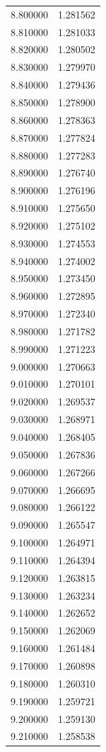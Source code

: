 \begin{tabular}{rr}
8.800000 & 1.281562 \\
8.810000 & 1.281033 \\
8.820000 & 1.280502 \\
8.830000 & 1.279970 \\
8.840000 & 1.279436 \\
8.850000 & 1.278900 \\
8.860000 & 1.278363 \\
8.870000 & 1.277824 \\
8.880000 & 1.277283 \\
8.890000 & 1.276740 \\
8.900000 & 1.276196 \\
8.910000 & 1.275650 \\
8.920000 & 1.275102 \\
8.930000 & 1.274553 \\
8.940000 & 1.274002 \\
8.950000 & 1.273450 \\
8.960000 & 1.272895 \\
8.970000 & 1.272340 \\
8.980000 & 1.271782 \\
8.990000 & 1.271223 \\
9.000000 & 1.270663 \\
9.010000 & 1.270101 \\
9.020000 & 1.269537 \\
9.030000 & 1.268971 \\
9.040000 & 1.268405 \\
9.050000 & 1.267836 \\
9.060000 & 1.267266 \\
9.070000 & 1.266695 \\
9.080000 & 1.266122 \\
9.090000 & 1.265547 \\
9.100000 & 1.264971 \\
9.110000 & 1.264394 \\
9.120000 & 1.263815 \\
9.130000 & 1.263234 \\
9.140000 & 1.262652 \\
9.150000 & 1.262069 \\
9.160000 & 1.261484 \\
9.170000 & 1.260898 \\
9.180000 & 1.260310 \\
9.190000 & 1.259721 \\
9.200000 & 1.259130 \\
9.210000 & 1.258538 \\

\end{tabular}
